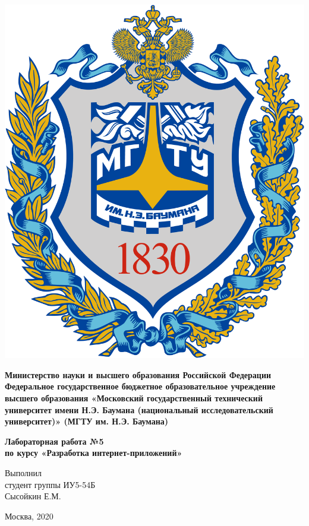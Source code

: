 \documentclass[20pt,a4paper]{report}
\begin{document}
	\begin{titlepage}
		\begin{minipage}{0.3\textwidth}
		\includegraphics[scale=0.03]{logo.png}	
		\end{minipage}
		\begin{minipage}{0.6\textwidth}\centering
			\textbf{
				Министерство науки и высшего образования Российской Федерации
				Федеральное государственное бюджетное образовательное 
				учреждение высшего образования
				«Московский государственный технический университет
				имени Н.Э. Баумана (национальный исследовательский университет)»
				(МГТУ им. Н.Э. Баумана)
			}	
		\end{minipage}
	
		\vspace{5cm}
		\centering
		\Large
		\textbf{
			Лабораторная работа №5 \\
			по курсу «Разработка интернет-приложений» \\
		}

		\vspace{6cm}
		\begin{flushright}
			Выполнил \\ 
			студент группы ИУ5-54Б \\ 
			Сысойкин Е.М. 
		\end{flushright}
		\vspace{5cm}
		Москва, 2020
	\end{titlepage}
\end{document}
